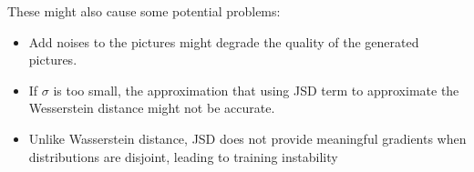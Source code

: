 \documentclass[a4 paper,12pt]{article}
\theoremstyle{definitionstyle}
\begin{document}
These might also cause some potential problems:
\begin{itemize}
  \item Add noises to the pictures might degrade the quality of the generated pictures.
  \item If $\sigma$ is too small, the approximation that using JSD term to approximate the Wesserstein distance might not be accurate.
  \item Unlike Wasserstein distance, JSD does not provide meaningful gradients when distributions are disjoint, leading to training instability
\end{itemize}
\end{document}
